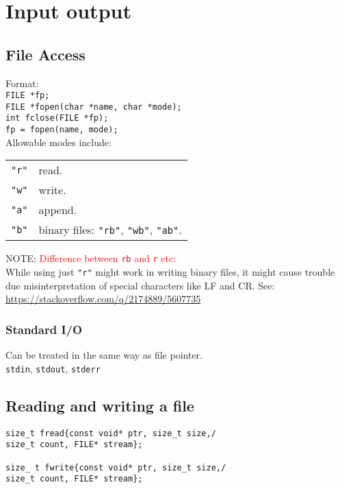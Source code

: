 \section{Input output}

\subsection{File Access}

Format:\\

\texttt{FILE *fp;}\\
\texttt{FILE *fopen(char *name, char *mode);}\\
\texttt{int fclose(FILE *fp);}\\
\texttt{fp = fopen(name, mode);}\\

Allowable modes include:\\
\begin{tabularx}{\linewidth}{lX}
\texttt{"r"} & read.\\
\texttt{"w"} & write.\\
\texttt{"a"} & append.\\
\texttt{"b"} & binary files: \texttt{"rb"}, \texttt{"wb"}, \texttt{"ab"}.\\
\end{tabularx}
NOTE: \textcolor{red}{Difference between \texttt{rb} and \texttt{r} etc:}\\
While using just \texttt{"r"} might work in writing binary files, it might cause trouble due misinterpretation of special characters like LF and CR. See: \url{https://stackoverflow.com/q/2174889/5607735} 

\subsubsection{Standard I/O}
Can be treated in the same way as file pointer.\\
\texttt{stdin}, \texttt{stdout}, \texttt{stderr}\\

\subsection{Reading and writing a file}
\begin{verbatim}
size_t fread{const void* ptr, size_t size,/
size_t count, FILE* stream};

size_ t fwrite{const void* ptr, size_t size,/
size_t count, FILE* stream};
\end{verbatim}

